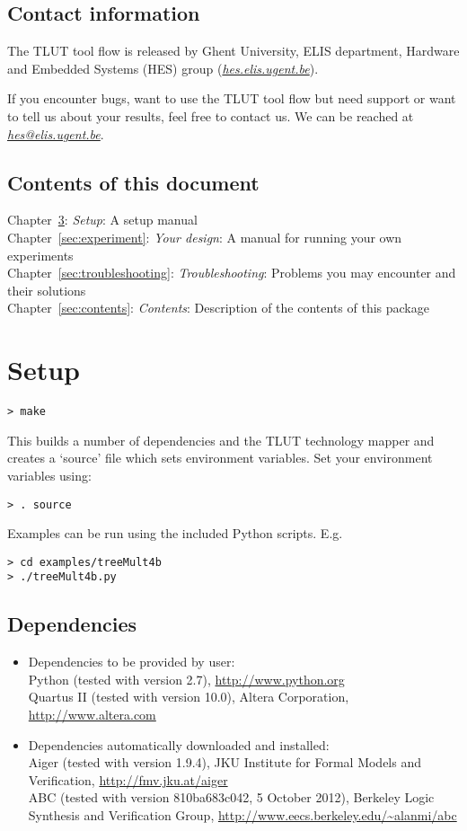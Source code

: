 \documentclass[a4paper,oneside]{memoir}
\begin{document}
\section{Contact information}
The TLUT tool flow is released by Ghent University, ELIS department, Hardware and Embedded Systems (HES) group (\href{http://hes.elis.ugent.be}{\emph{hes.elis.ugent.be}}).

If you encounter bugs, want to use the TLUT tool flow but need support or want to tell us about your results, feel free to contact us.
We can be reached at \href{mailto:hes@elis.ugent.be}{\emph{hes@elis.ugent.be}}.


\section{Contents of this document}
Chapter~\ref{sec:setup}: \emph{Setup}: A setup manual\\
Chapter~\ref{sec:experiment}: \emph{Your design}: A manual for running your own experiments\\
Chapter~\ref{sec:troubleshooting}: \emph{Troubleshooting}: Problems you may encounter and their solutions\\
Chapter~\ref{sec:contents}: \emph{Contents}: Description of the contents of this package


\clearpage
\chapter{Setup}\label{sec:setup}
\begin{lstlisting}
> make
\end{lstlisting}
This builds a number of dependencies and the TLUT technology mapper and creates a `source' file which sets environment variables. Set your environment variables using:
\begin{lstlisting}
> . source
\end{lstlisting}
Examples can be run using the included Python scripts.
E.g.
\begin{lstlisting}
> cd examples/treeMult4b
> ./treeMult4b.py
\end{lstlisting}

\section{Dependencies}
\begin{itemize}
\item Dependencies to be provided by user:\\
Python (tested with version 2.7), \url{http://www.python.org}\\
Quartus II (tested with version 10.0), Altera Corporation, \url{http://www.altera.com}
\item Dependencies automatically downloaded and installed:\\
Aiger (tested with version 1.9.4), JKU Institute for Formal Models and Verification, \url{http://fmv.jku.at/aiger}\\
ABC (tested with version 810ba683c042, 5 October 2012), Berkeley Logic Synthesis and Verification Group, \url{http://www.eecs.berkeley.edu/\~alanmi/abc}
\end{itemize}
\end{document}
